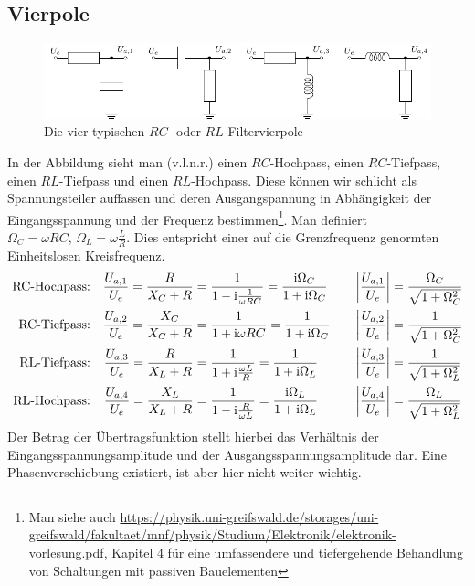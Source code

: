 \subsection*{Vierpole}
\begin{figure}[h!]
    \centering
    \includegraphics[scale=1.1]{elektroPhilip3.pdf}
    \caption{Die vier typischen $RC$- oder $RL$-Filtervierpole}
\end{figure}
%
In der Abbildung sieht man (v.l.n.r.) einen $RC$-Hochpass, einen $RC$-Tiefpass, einen $RL$-Tiefpass
und einen $RL$-Hochpass.
Diese können wir schlicht als Spannungsteiler auffassen und deren Ausgangspannung in Abhängigkeit der Eingangsspannung und der Frequenz bestimmen\footnote{
Man siehe auch \url{https://physik.uni-greifswald.de/storages/uni-greifswald/fakultaet/mnf/physik/Studium/Elektronik/elektronik-vorlesung.pdf}, Kapitel 4 für eine umfassendere und tiefergehende Behandlung von Schaltungen mit passiven Bauelementen}.
Man definiert $\Omega_C = \omega RC, \, \Omega_L = \omega\frac{L}{R}$. Dies entspricht einer auf die Grenzfrequenz genormten Einheitslosen Kreisfrequenz.
\begin{align}
    \text{RC-Hochpass:} && 
    \frac{U_{a,1}}{U_e} = \frac{R}{X_C + R}   &=
        \frac{1}{1 - \mathrm{i} \frac{1}{\omega RC}} =
        \frac{\mathrm{i} \Omega_C}{1 + \mathrm{i} \Omega_C} &\quad
        \abs{\frac{U_{a,1}}{U_e}} &= \frac{\Omega_C}{\sqrt{1+\Omega_C^2}}\\
    \text{RC-Tiefpass:} && 
    \frac{U_{a,2}}{U_e} = \frac{X_C}{X_C + R} &= 
        \frac{1}{1 + \mathrm{i} \omega RC} =
        \frac{1}{1 + \mathrm{i} \Omega_C} &\quad
        \abs{\frac{U_{a,2}}{U_e}} &= \frac{1}{\sqrt{1+\Omega_C^2}}\\
    \text{RL-Tiefpass:} && 
    \frac{U_{a,3}}{U_e} = \frac{R}{X_L + R} &= 
        \frac{1}{1 + \mathrm{i}  \frac{\omega L}{R}} =
        \frac{1}{1 + \mathrm{i} \Omega_L} &\quad
        \abs{\frac{U_{a,3}}{U_e}} &= \frac{1}{\sqrt{1+\Omega_L^2}}\\
    \text{RL-Hochpass:} && 
    \frac{U_{a,4}}{U_e} = \frac{X_L}{X_L + R} &= 
        \frac{1}{1 - \mathrm{i} \frac{R}{\omega L}} =
        \frac{\mathrm{i} \Omega_L}{1 + \mathrm{i} \Omega_L} &\quad
        \abs{\frac{U_{a,4}}{U_e}} &= \frac{\Omega_L}{\sqrt{1+\Omega_L^2}} 
\end{align}
Der Betrag der Übertragsfunktion stellt hierbei das Verhältnis der Eingangsspannungsamplitude und der Ausgangsspannungsamplitude dar. Eine Phasenverschiebung existiert, ist aber hier nicht weiter wichtig.

